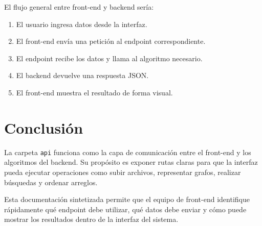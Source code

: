 \documentclass[12pt]{article}
\begin{document}
El flujo general entre front-end y backend sería:

\begin{enumerate}
	\item El usuario ingresa datos desde la interfaz.
	\item El front-end envía una petición al endpoint correspondiente.
	\item El endpoint recibe los datos y llama al algoritmo necesario.
	\item El backend devuelve una respuesta JSON.
	\item El front-end muestra el resultado de forma visual.
\end{enumerate}

\section{Conclusión}

La carpeta \texttt{api} funciona como la capa de comunicación entre el front-end y los algoritmos del backend. Su propósito es exponer rutas claras para que la interfaz pueda ejecutar operaciones como subir archivos, representar grafos, realizar búsquedas y ordenar arreglos.

Esta documentación sintetizada permite que el equipo de front-end identifique rápidamente qué endpoint debe utilizar, qué datos debe enviar y cómo puede mostrar los resultados dentro de la interfaz del sistema.
	
\end{document}
